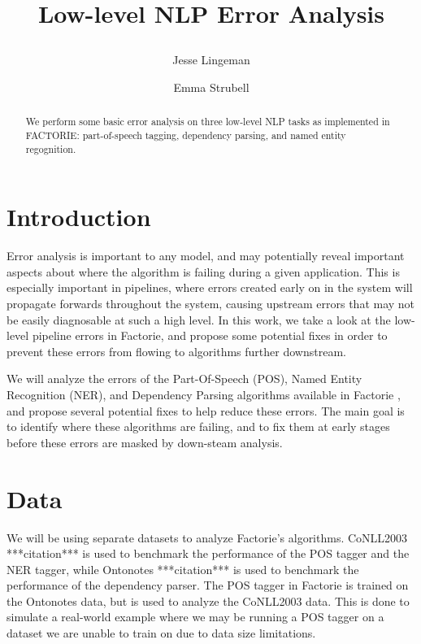 \documentclass[12pt]{article}
\title{
\LARGE\bf Low-level NLP Error Analysis \\
\date{}
\author{ Jesse Lingeman \and Emma Strubell}
}
\begin{document}
\maketitle

\begin{abstract}
We perform some basic error analysis on three low-level NLP tasks as implemented in FACTORIE: part-of-speech tagging, dependency parsing, and named entity regognition.
\end{abstract}

\thispagestyle{fancy}


\section{Introduction}
Error analysis is important to any model, and may potentially reveal important aspects about where the algorithm is failing during a given application. This is especially important in pipelines, where errors created early on in the system will propagate forwards throughout the system, causing upstream errors that may not be easily diagnosable at such a high level. In this work, we take a look at the low-level pipeline errors in Factorie, and propose some potential fixes in order to prevent these errors from flowing to algorithms further downstream.

We will analyze the errors of the Part-Of-Speech (POS), Named Entity Recognition (NER), and Dependency Parsing algorithms available in Factorie \citep{mccallum09:factorie:}, and propose several potential fixes to help reduce these errors. The main goal is to identify where these algorithms are failing, and to fix them at early stages before these errors are masked by down-steam analysis.

\section{Data}
We will be using separate datasets to analyze Factorie’s algorithms. CoNLL2003 ***citation*** is used to benchmark the performance of the POS tagger and the NER tagger, while Ontonotes ***citation*** is used to benchmark the performance of the dependency parser. The POS tagger in Factorie is trained on the Ontonotes data, but is used to analyze the CoNLL2003 data. This is done to simulate a real-world example where we may be running a POS tagger on a dataset we are unable to train on due to data size limitations.
\end{document}
